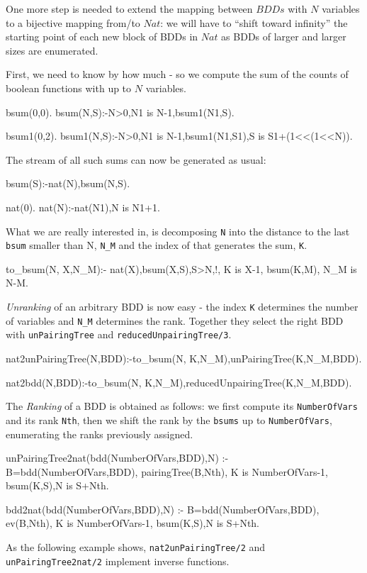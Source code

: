 \documentclass[]{INCLUDES/llncs}
\begin{document}
One more step is needed to extend the mapping between $BDDs$ with $N$
variables to a bijective mapping from/to $Nat$: 
we will have to ``shift toward infinity'' 
the starting point of each new block of 
BDDs in $Nat$ as BDDs of larger and larger sizes are enumerated.

First, we need to know by how much - so we compute the sum of the
counts of boolean functions with up to $N$ variables.
\begin{code}
bsum(0,0).
bsum(N,S):-N>0,N1 is N-1,bsum1(N1,S).

bsum1(0,2).
bsum1(N,S):-N>0,N1 is N-1,bsum1(N1,S1),S is S1+(1<<(1<<N)).
\end{code}

The stream of all such sums can now be generated as usual:
\begin{code}
bsum(S):-nat(N),bsum(N,S).

nat(0).
nat(N):-nat(N1),N is N1+1.
\end{code}
What we are really interested in, is decomposing {\tt N} into
the distance to the
last {\tt bsum} smaller than N, {\tt N\_M}
and the index of that generates the sum, {\tt K}.
\begin{code}
to_bsum(N, X,N_M):-
  nat(X),bsum(X,S),S>N,!,
  K is X-1,
  bsum(K,M),
  N_M is N-M.
\end{code}
{\em Unranking} of an arbitrary BDD is now easy - the index {\tt K}
determines the number of variables and {\tt N\_M} determines
the rank. Together they select the right BDD
with {\tt unPairingTree} and {\tt reducedUnpairingTree/3}.
\begin{code}
nat2unPairingTree(N,BDD):-to_bsum(N, K,N_M),unPairingTree(K,N_M,BDD).

nat2bdd(N,BDD):-to_bsum(N, K,N_M),reducedUnpairingTree(K,N_M,BDD).
\end{code}
The {\em Ranking} of a BDD is obtained as follows: we first compute
its {\tt NumberOfVars} and its rank {\tt Nth}, then we shift the rank by 
the {\tt bsums} up to {\tt NumberOfVars}, enumerating the
ranks previously assigned.
\begin{code}
unPairingTree2nat(bdd(NumberOfVars,BDD),N) :-
  B=bdd(NumberOfVars,BDD),
  pairingTree(B,Nth),
  K is NumberOfVars-1,
  bsum(K,S),N is S+Nth.

bdd2nat(bdd(NumberOfVars,BDD),N) :-
  B=bdd(NumberOfVars,BDD),
  ev(B,Nth),
  K is NumberOfVars-1,
  bsum(K,S),N is S+Nth.  
\end{code}
As the following example shows, {\tt nat2unPairingTree/2}
and {\tt unPairingTree2nat/2} implement inverse functions.
\end{document}
